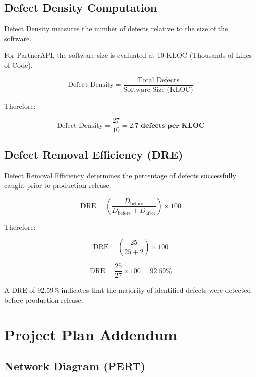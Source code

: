 \documentclass[12pt,a4paper]{article}
\begin{document}
\subsection{Defect Density Computation}

Defect Density measures the number of defects relative to the size
of the software.

For PartnerAPI, the software size is evaluated at 10 KLOC
(Thousands of Lines of Code).

\[
\text{Defect Density}
=
\frac{\text{Total Defects}}
{\text{Software Size (KLOC)}}
\]

Therefore:

\[
\text{Defect Density}
=
\frac{27}{10}
=
\mathbf{2.7\text{ defects per KLOC}}
\]

\subsection{Defect Removal Efficiency (DRE)}

Defect Removal Efficiency determines the percentage of defects
successfully caught prior to production release.

\[
\text{DRE}
=
\left(
\frac{D_{\text{before}}}
{D_{\text{before}} + D_{\text{after}}}
\right)
\times 100
\]

Therefore:

\[
\text{DRE}
=
\left(
\frac{25}{25+2}
\right)
\times 100
\]

\[
\text{DRE}
=
\frac{25}{27}
\times 100
=
\mathbf{92.59\%}
\]

A DRE of 92.59\% indicates that the majority of identified defects
were detected before production release.

\newpage

\section{Project Plan Addendum}

\subsection{Network Diagram (PERT)}
\end{document}
